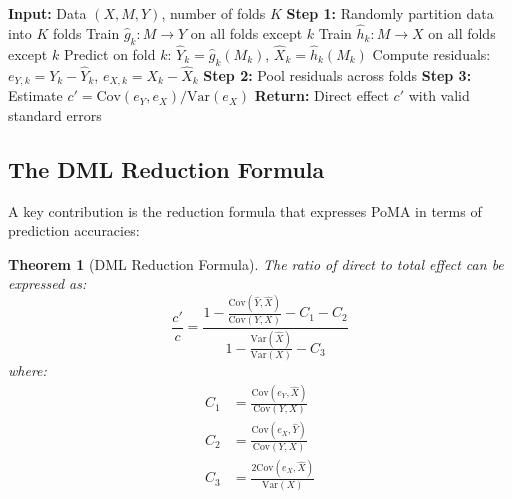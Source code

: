 \documentclass[11pt,a4paper]{article}
\newtheorem{theorem}{Theorem}
\newcommand{\Var}{\text{Var}}
\newcommand{\Cov}{\text{Cov}}
\begin{document}
\begin{algorithm}
\caption{DML Mediation Analysis}
\begin{algorithmic}
\STATE \textbf{Input:} Data $(X, M, Y)$, number of folds $K$
\STATE \textbf{Step 1:} Randomly partition data into $K$ folds
    \STATE Train $\hat{g}_k: M \to Y$ on all folds except $k$
    \STATE Train $\hat{h}_k: M \to X$ on all folds except $k$
    \STATE Predict on fold $k$: $\hat{Y}_k = \hat{g}_k(M_k)$, $\hat{X}_k = \hat{h}_k(M_k)$
    \STATE Compute residuals: $e_{Y,k} = Y_k - \hat{Y}_k$, $e_{X,k} = X_k - \hat{X}_k$
\ENDFOR
\STATE \textbf{Step 2:} Pool residuals across folds
\STATE \textbf{Step 3:} Estimate $c' = \Cov(e_Y, e_X) / \Var(e_X)$
\STATE \textbf{Return:} Direct effect $c'$ with valid standard errors
\end{algorithmic}
\end{algorithm}

\subsection{The DML Reduction Formula}

A key contribution is the reduction formula that expresses PoMA in terms of prediction accuracies:

\begin{theorem}[DML Reduction Formula]
The ratio of direct to total effect can be expressed as:
\begin{equation}
\frac{c'}{c} = \frac{1 - \frac{\Cov(\hat{Y}, \hat{X})}{\Cov(Y,X)} - C_1 - C_2}{1 - \frac{\Var(\hat{X})}{\Var(X)} - C_3}
\end{equation}
where:
\begin{align}
C_1 &= \frac{\Cov(e_Y, \hat{X})}{\Cov(Y,X)} \\
C_2 &= \frac{\Cov(e_X, \hat{Y})}{\Cov(Y,X)} \\
C_3 &= \frac{2\Cov(e_X, \hat{X})}{\Var(X)}
\end{align}
\end{theorem}
\end{document}
